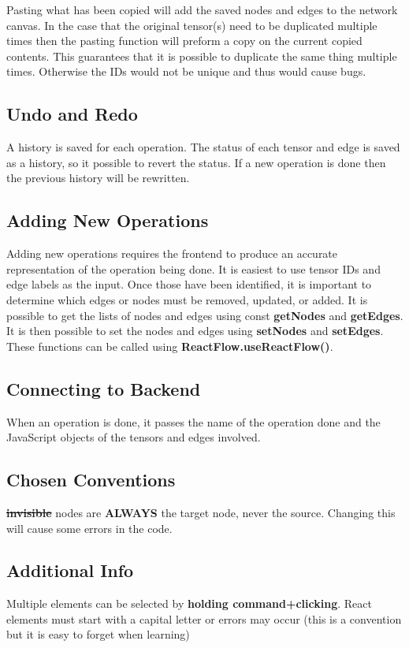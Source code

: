 \documentclass{juliacon}
\providecommand{\DIFaddtex}[1]{{\protect\color{blue}\uwave{#1}}} %
\providecommand{\DIFdeltex}[1]{{\protect\color{red}\sout{#1}}}                      %
\providecommand{\DIFaddbegin}{} %
\providecommand{\DIFaddend}{} %
\providecommand{\DIFdelbegin}{} %
\providecommand{\DIFdelend}{} %
\providecommand{\DIFadd}[1]{\texorpdfstring{\DIFaddtex{#1}}{#1}} %
\providecommand{\DIFdel}[1]{\texorpdfstring{\DIFdeltex{#1}}{}} %
\begin{document}
\begin{appendix}
Pasting what has been copied will add the saved nodes and edges to the network canvas. In the case that the original tensor(s) need to be duplicated multiple times then the pasting function will preform a copy on the current copied contents. This guarantees that it is possible to duplicate the same thing multiple times. Otherwise the IDs would not be unique and thus would cause bugs. 


\subsection{Undo and Redo}
A history is saved for each operation. The status of each tensor and edge is saved as a history, so it possible to revert the status. If a new operation is done then the previous history will be rewritten.

\subsection{Adding New Operations}
Adding new operations requires the frontend to produce an accurate representation of the operation being done. It is easiest to use tensor IDs and edge labels as the input. Once those have been identified, it is important to determine which edges or nodes must be removed, updated, or added. It is possible to get the lists of nodes and edges using const \textbf{getNodes} and \textbf{getEdges}. It is then possible to set the nodes and edges using \textbf{setNodes} and \textbf{setEdges}. These functions can be called using \textbf{ ReactFlow.useReactFlow()}.

\subsection{Connecting to Backend}
When an operation is done, it passes the name of the operation done and the JavaScript objects of the tensors and edges involved.

\subsection{Chosen Conventions}
\textbf{\DIFdelbegin \DIFdel{invisible}\DIFdelend \DIFaddbegin \DIFadd{Invisible}\DIFaddend } nodes are \textbf{ALWAYS} the target node, never the source. Changing this will cause some errors in the code.

\subsection{Additional Info}
Multiple elements can be selected by \textbf{holding command+clicking}. React elements must start with a capital letter or errors may occur (this is a convention but it is easy to forget when learning)



\end{appendix}
\end{document}
